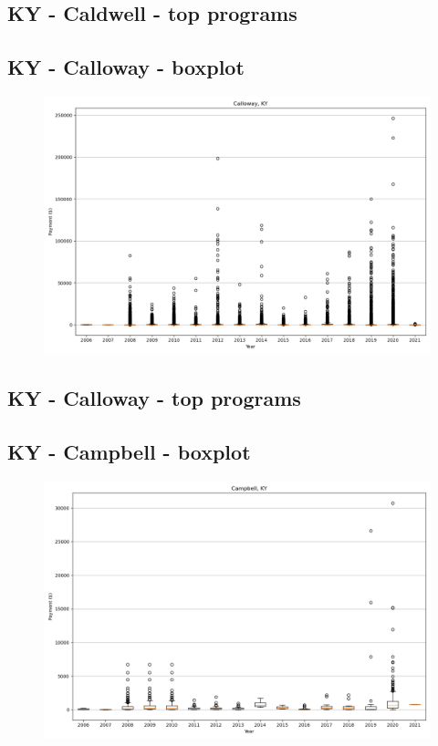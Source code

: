 \subsection*{KY - Caldwell - top programs}

\newpage
\subsection*{KY - Calloway - boxplot}
\begin{figure}[h]
\centering
\includegraphics[width=7in]{../output/boxplots/counties/Calloway-KY_boxplot.png}
\end{figure}


\subsection*{KY - Calloway - top programs}

\newpage
\subsection*{KY - Campbell - boxplot}
\begin{figure}[h]
\centering
\includegraphics[width=7in]{../output/boxplots/counties/Campbell-KY_boxplot.png}
\end{figure}


